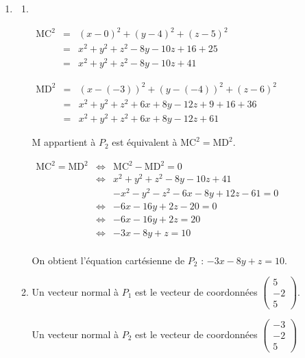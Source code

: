 \documentclass[10pt]{article}
\begin{document}
\begin{enumerate}
\begin{enumerate}
Ainsi $5x - 2y + 5z = 10$ est une équation cartésienne de $P_1$.
	\end{enumerate}
	\item
	\begin{enumerate}
	\item \ {}

	$\begin{array}{ccl}\text{MC}^2 &=& (x - 0)^2 + (y - 4)^2 + (z - 5)^2\\ &=& x^2 + y^2 + z^2 -8y -10z + 16 + 25 \\ &=& x^2 + y^2 + z^2 -8y -10z + 41\end{array}$

	$\begin{array}{ccl}\text{MD}^2 &=&  (x - (-3))^2 + (y - (-4))^2 + (z - 6)^2\\ &=&  x^2 + y^2 + z^2 + 6x + 8y -12z + 9 + 16 + 36 \\&=&  x^2 + y^2 + z^2 + 6x + 8y - 12z + 61\end{array}$
	
	M appartient à $P_2$ est équivalent à $\text{MC}^2 = \text{MD}^2$.
	
	$
	\begin{array}{ccl}
	\text{MC}^2 = \text{MD}^2 & \iff & \text{MC}^2 - \text{MD}^2 = 0\\
	& \iff & x^2 + y^2 + z^2 -8y -10z + 41 \\&&- x^2 - y^2 - z^2 - 6x - 8y + 12z - 61 = 0\\
	& \iff & - 6x - 16y + 2z - 20 = 0\\
	& \iff & - 6x - 16y + 2z  = 20\\
	& \iff & - 3x - 8y + z  = 10\\
	\end{array}
	$
	
	On obtient l'équation cartésienne de $P_2$ : $- 3x - 8y + z  = 10$.
	\item Un vecteur normal à $P_1$ est le vecteur de coordonnées $\left(
	\begin{array}{c}
	5\\
	-2\\
	5
	\end{array}
	\right)$.
	
	Un vecteur normal à $P_2$ est le vecteur de coordonnées $\left(
	\begin{array}{c}
	-3\\
	-2\\
	5
	\end{array}
	\right)$
	

\end{enumerate}
\end{enumerate}
\end{document}
